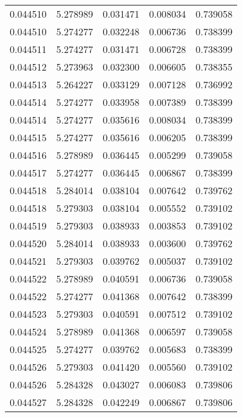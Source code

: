 \begin{tabular}{lrrrr}
0.044510    &  5.278989 &  0.031471 &  0.008034 &             0.739058 \\
0.044510    &  5.274277 &  0.032248 &  0.006736 &             0.738399 \\
0.044511    &  5.274277 &  0.031471 &  0.006728 &             0.738399 \\
0.044512    &  5.273963 &  0.032300 &  0.006605 &             0.738355 \\
0.044513    &  5.264227 &  0.033129 &  0.007128 &             0.736992 \\
0.044514    &  5.274277 &  0.033958 &  0.007389 &             0.738399 \\
0.044514    &  5.274277 &  0.035616 &  0.008034 &             0.738399 \\
0.044515    &  5.274277 &  0.035616 &  0.006205 &             0.738399 \\
0.044516    &  5.278989 &  0.036445 &  0.005299 &             0.739058 \\
0.044517    &  5.274277 &  0.036445 &  0.006867 &             0.738399 \\
0.044518    &  5.284014 &  0.038104 &  0.007642 &             0.739762 \\
0.044518    &  5.279303 &  0.038104 &  0.005552 &             0.739102 \\
0.044519    &  5.279303 &  0.038933 &  0.003853 &             0.739102 \\
0.044520    &  5.284014 &  0.038933 &  0.003600 &             0.739762 \\
0.044521    &  5.279303 &  0.039762 &  0.005037 &             0.739102 \\
0.044522    &  5.278989 &  0.040591 &  0.006736 &             0.739058 \\
0.044522    &  5.274277 &  0.041368 &  0.007642 &             0.738399 \\
0.044523    &  5.279303 &  0.040591 &  0.007512 &             0.739102 \\
0.044524    &  5.278989 &  0.041368 &  0.006597 &             0.739058 \\
0.044525    &  5.274277 &  0.039762 &  0.005683 &             0.738399 \\
0.044526    &  5.279303 &  0.041420 &  0.005560 &             0.739102 \\
0.044526    &  5.284328 &  0.043027 &  0.006083 &             0.739806 \\
0.044527    &  5.284328 &  0.042249 &  0.006867 &             0.739806 \\

\end{tabular}
